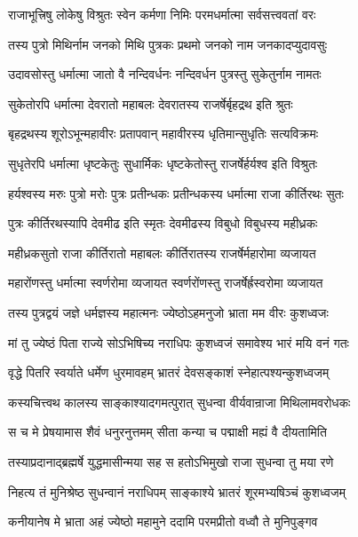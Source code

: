 \twolineshloka
{राजाभूत्त्रिषु लोकेषु विश्रुतः स्वेन कर्मणा}
{निमिः परमधर्मात्मा सर्वसत्त्ववतां वरः} %

\twolineshloka
{तस्य पुत्रो मिथिर्नाम जनको मिथि पुत्रकः}
{प्रथमो जनको नाम जनकादप्युदावसुः} %

\twolineshloka
{उदावसोस्तु धर्मात्मा जातो वै नन्दिवर्धनः}
{नन्दिवर्धन पुत्रस्तु सुकेतुर्नाम नामतः} %

\twolineshloka
{सुकेतोरपि धर्मात्मा देवरातो महाबलः}
{देवरातस्य राजर्षेर्बृहद्रथ इति श्रुतः} %

\twolineshloka
{बृहद्रथस्य शूरोऽभून्महावीरः प्रतापवान्}
{महावीरस्य धृतिमान्सुधृतिः सत्यविक्रमः} %

\twolineshloka
{सुधृतेरपि धर्मात्मा धृष्टकेतुः सुधार्मिकः}
{धृष्टकेतोस्तु राजर्षेर्हर्यश्व इति विश्रुतः} %

\twolineshloka
{हर्यश्वस्य मरुः पुत्रो मरोः पुत्रः प्रतीन्धकः}
{प्रतीन्धकस्य धर्मात्मा राजा कीर्तिरथः सुतः} %

\twolineshloka
{पुत्रः कीर्तिरथस्यापि देवमीढ इति स्मृतः}
{देवमीढस्य विबुधो विबुधस्य महीध्रकः} %

\twolineshloka
{महीध्रकसुतो राजा कीर्तिरातो महाबलः}
{कीर्तिरातस्य राजर्षेर्महारोमा व्यजायत} %

\twolineshloka
{महारोंणस्तु धर्मात्मा स्वर्णरोमा व्यजायत}
{स्वर्णरोंणस्तु राजर्षेर्ह्रस्वरोमा व्यजायत} %

\twolineshloka
{तस्य पुत्रद्वयं जज्ञे धर्मज्ञस्य महात्मनः}
{ज्येष्ठोऽहमनुजो भ्राता मम वीरः कुशध्वजः} %

\twolineshloka
{मां तु ज्येष्ठं पिता राज्ये सोऽभिषिच्य नराधिपः}
{कुशध्वजं समावेश्य भारं मयि वनं गतः} %

\twolineshloka
{वृद्धे पितरि स्वर्याते धर्मेण धुरमावहम्}
{भ्रातरं देवसङ्काशं स्नेहात्पश्यन्कुशध्वजम्} %

\twolineshloka
{कस्यचित्त्वथ कालस्य साङ्काश्यादगमत्पुरात्}
{सुधन्वा वीर्यवान्राजा मिथिलामवरोधकः} %

\twolineshloka
{स च मे प्रेषयामास शैवं धनुरनुत्तमम्}
{सीता कन्या च पद्माक्षी मह्यं वै दीयतामिति} %

\twolineshloka
{तस्याप्रदानाद्ब्रह्मर्षे युद्धमासीन्मया सह}
{स हतोऽभिमुखो राजा सुधन्वा तु मया रणे} %

\twolineshloka
{निहत्य तं मुनिश्रेष्ठ सुधन्वानं नराधिपम्}
{साङ्काश्ये भ्रातरं शूरमभ्यषिञ्चं कुशध्वजम्} %

\twolineshloka
{कनीयानेष मे भ्राता अहं ज्येष्ठो महामुने}
{ददामि परमप्रीतो वध्वौ ते मुनिपुङ्गव} %

